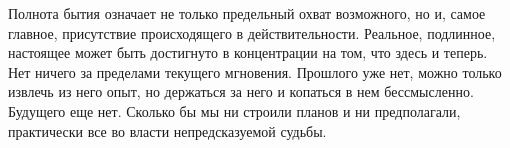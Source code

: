 
Полнота
бытия означает не только предельный охват возможного, но и, самое главное,
присутствие происходящего в
действительности. Реальное, подлинное, настоящее может быть достигнуто в
концентрации на том, что здесь и теперь. Нет ничего за пределами текущего
мгновения. Прошлого уже нет, можно только извлечь из него опыт, но держаться за
него и копаться в нем бессмысленно. Будущего еще нет. Сколько бы мы ни строили
планов и ни предполагали, практически все во власти непредсказуемой судьбы. 


